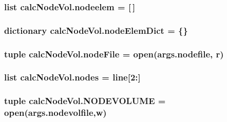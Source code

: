 \subsubsection[{nodeelem}]{\setlength{\rightskip}{0pt plus 5cm}list calc\+Node\+Vol.\+nodeelem = \mbox{[}$\,$\mbox{]}}\label{namespacecalcNodeVol_a3161aff26f5497302aa9ea4b890f3fc6}
\hypertarget{namespacecalcNodeVol_ac718aba17bb94c6db456591acb67f47e}{}
\subsubsection[{node\+Elem\+Dict}]{\setlength{\rightskip}{0pt plus 5cm}dictionary calc\+Node\+Vol.\+node\+Elem\+Dict = \{\}}\label{namespacecalcNodeVol_ac718aba17bb94c6db456591acb67f47e}
\hypertarget{namespacecalcNodeVol_a86debe38847ec21b83c2ff90bb216cc7}{}
\subsubsection[{node\+File}]{\setlength{\rightskip}{0pt plus 5cm}tuple calc\+Node\+Vol.\+node\+File = open(args.\+nodefile, \textquotesingle{}r\textquotesingle{})}\label{namespacecalcNodeVol_a86debe38847ec21b83c2ff90bb216cc7}
\hypertarget{namespacecalcNodeVol_ad39900d19f269b32851440849e1f5e95}{}
\subsubsection[{nodes}]{\setlength{\rightskip}{0pt plus 5cm}list calc\+Node\+Vol.\+nodes = {\bf line}\mbox{[}2\+:\mbox{]}}\label{namespacecalcNodeVol_ad39900d19f269b32851440849e1f5e95}
\hypertarget{namespacecalcNodeVol_a8b760a87dcb6a98ccaa1440100944f7b}{}
\subsubsection[{N\+O\+D\+E\+V\+O\+L\+U\+M\+E}]{\setlength{\rightskip}{0pt plus 5cm}tuple calc\+Node\+Vol.\+N\+O\+D\+E\+V\+O\+L\+U\+M\+E = open(args.\+nodevolfile,\textquotesingle{}w\textquotesingle{})}\label{namespacecalcNodeVol_a8b760a87dcb6a98ccaa1440100944f7b}
\hypertarget{namespacecalcNodeVol_a517a8b9eea5e927318263ea38b374120}{}
